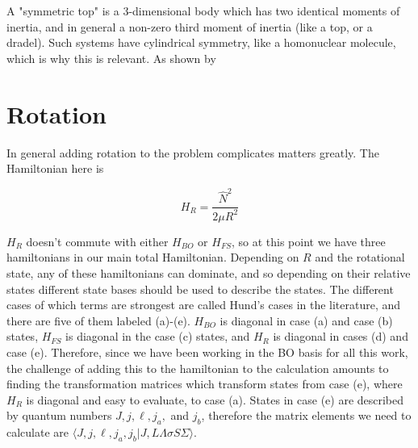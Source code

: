 \documentclass[prl, longbibliography]{revtex4-2}
\begin{document}
A "symmetric top" is a 3-dimensional body which has two identical moments of inertia, and in general a non-zero third moment of inertia (like a top, or a dradel). Such systems have cylindrical symmetry, like a homonuclear molecule, which is why this is relevant. As shown by 

\section{Rotation}

In general adding rotation to the problem complicates matters greatly. The Hamiltonian here is

\begin{equation}
H_R = \frac{\hat{N}^2}{2\mu R^2}
\end{equation}

$H_R$ doesn't commute with either $H_{BO}$ or $H_{FS}$, so at this point we have three hamiltonians in our main total Hamiltonian. Depending on $R$ and the rotational state, any of these hamiltonians can dominate, and so depending on their relative states different state bases should be used to describe the states. The different cases of which terms are strongest are called Hund's cases in the literature, and there are five of them labeled (a)-(e). $H_{BO}$ is diagonal in case (a) and case (b) states, $H_{FS}$ is diagonal in the case (c) states, and $H_R$ is diagonal in cases (d) and case (e). Therefore, since we have been working in the BO basis for all this work, the challenge of adding this to the hamiltonian to the calculation amounts to finding the transformation matrices which transform states from case (e), where $H_R$ is diagonal and easy to evaluate, to case (a). States in case (e) are described by quantum numbers $J, j, \ell, j_a, $ and $j_b$, therefore the matrix elements we need to calculate are $\langle J, j, \ell, j_a, j_b|J, L\Lambda\sigma S \Sigma\rangle$.
\end{document}
